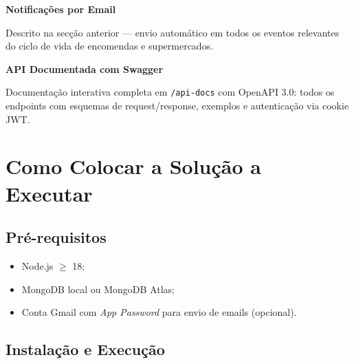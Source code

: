 \documentclass[12pt,a4paper]{article}
\begin{document}
\vspace{0.3cm}
\textbf{Notificações por Email}

Descrito na secção anterior --- envio automático em todos os eventos relevantes do ciclo de vida de encomendas e supermercados.

\vspace{0.3cm}
\textbf{API Documentada com Swagger}

Documentação interativa completa em \texttt{/api-docs} com OpenAPI 3.0: todos os endpoints com esquemas de request/response, exemplos e autenticação via cookie JWT.

\section{Como Colocar a Solução a Executar}

\subsection{Pré-requisitos}

\begin{itemize}[leftmargin=*, label=\textcolor{primaryblue}{\textbullet}]
  \item Node.js $\geq$ 18;
  \item MongoDB local ou MongoDB Atlas;
  \item Conta Gmail com \textit{App Password} para envio de emails (opcional).
\end{itemize}

\subsection{Instalação e Execução}
\end{document}
